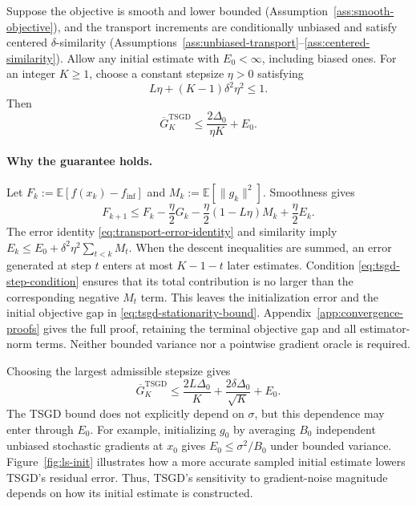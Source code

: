 \begin{mdframed}[
  nobreak=true,
  linecolor=black!55,linewidth=0.7pt,
  innerleftmargin=10pt,innerrightmargin=10pt,
  innertopmargin=7pt,innerbottommargin=7pt
]
\begin{theorem}
\label{thm:tsgd-stationarity}
Suppose the objective is smooth and lower bounded
(Assumption~\ref{ass:smooth-objective}), and the transport increments
are conditionally unbiased and satisfy centered $\delta$-similarity
(Assumptions~\ref{ass:unbiased-transport}--\ref{ass:centered-similarity}).
Allow any initial estimate with $E_0<\infty$, including biased ones.
For an integer $K\geq1$, choose a constant stepsize $\eta>0$ satisfying
\begin{equation}
\label{eq:tsgd-step-condition}
L\eta+(K-1)\delta^2\eta^2\leq1.
\end{equation}
Then
\begin{equation}
\label{eq:tsgd-stationarity-bound}
\overline G_K^{\mathrm{TSGD}}
\leq\frac{2\Delta_0}{\eta K}+E_0.
\end{equation}
\end{theorem}
\end{mdframed}

\paragraph{Why the guarantee holds.}
Let $F_k:=\mathbb E[f(x_k)-f_{\inf}]$ and
$M_k:=\mathbb E[\|g_k\|^2]$. Smoothness gives
\begin{equation}
\label{eq:tsgd-fundamental-descent}
F_{k+1}\leq F_k-\frac\eta2G_k
  -\frac\eta2(1-L\eta)M_k+\frac\eta2E_k.
\end{equation}
The error identity \eqref{eq:transport-error-identity} and similarity
imply $E_k\leq E_0+\delta^2\eta^2\sum_{t<k}M_t$.
When the descent inequalities are summed, an error generated at step
$t$ enters at most $K-1-t$ later estimates. Condition
\eqref{eq:tsgd-step-condition} ensures that its total contribution is
no larger than the corresponding negative $M_t$ term. This leaves the
initialization error and the initial objective gap in
\eqref{eq:tsgd-stationarity-bound}. Appendix~\ref{app:convergence-proofs}
gives the full proof, retaining the terminal objective gap and all
estimator-norm terms. Neither bounded variance nor a pointwise
gradient oracle is required.

Choosing the largest admissible stepsize gives
\begin{equation}
\label{eq:tsgd-simplified-bound}
\boxed{\overline G_K^{\mathrm{TSGD}}
\leq\frac{2L\Delta_0}{K}
    +\frac{2\delta\Delta_0}{\sqrt K}+E_0.}
\end{equation}
The TSGD bound does not explicitly depend on $\sigma$, but this
dependence may enter through $E_0$. For example, initializing $g_0$
by averaging $B_0$ independent unbiased stochastic gradients at $x_0$
gives $E_0\leq\sigma^2/B_0$ under bounded variance.
Figure~\ref{fig:ls-init} illustrates how a more accurate sampled initial
estimate lowers TSGD's residual error.
Thus, TSGD's sensitivity to gradient-noise magnitude depends on how
its initial estimate is constructed.

